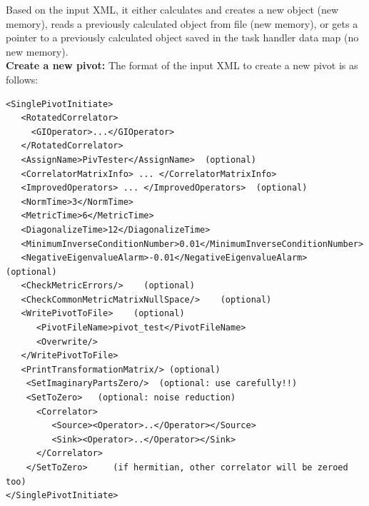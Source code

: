 \documentclass[12pt]{article}
\begin{document}
Based on the input XML, it either calculates and creates a new object (new memory),
reads a previously calculated object from file (new memory), or gets a pointer to
a previously calculated object saved in the task handler data map (no new memory).
\\[5mm]\noindent
\textbf{Create a new pivot:}\newline
The format of the input XML to create a new pivot is as follows:                                              
\begin{verbatim}
<SinglePivotInitiate>
   <RotatedCorrelator>
     <GIOperator>...</GIOperator>
   </RotatedCorrelator>
   <AssignName>PivTester</AssignName>  (optional)
   <CorrelatorMatrixInfo> ... </CorrelatorMatrixInfo>
   <ImprovedOperators> ... </ImprovedOperators>  (optional)
   <NormTime>3</NormTime>
   <MetricTime>6</MetricTime>
   <DiagonalizeTime>12</DiagonalizeTime>
   <MinimumInverseConditionNumber>0.01</MinimumInverseConditionNumber>
   <NegativeEigenvalueAlarm>-0.01</NegativeEigenvalueAlarm>  (optional)
   <CheckMetricErrors/>    (optional)
   <CheckCommonMetricMatrixNullSpace/>    (optional)
   <WritePivotToFile>    (optional)
      <PivotFileName>pivot_test</PivotFileName>
      <Overwrite/>
   </WritePivotToFile>
   <PrintTransformationMatrix/> (optional)
    <SetImaginaryPartsZero/>  (optional: use carefully!!)                   
    <SetToZero>   (optional: noise reduction)                               
      <Correlator>                                                          
         <Source><Operator>..</Operator></Source>                           
         <Sink><Operator>..</Operator></Sink>                               
      </Correlator>                                                         
    </SetToZero>     (if hermitian, other correlator will be zeroed too)    
</SinglePivotInitiate>
\end{verbatim}
\end{document}
